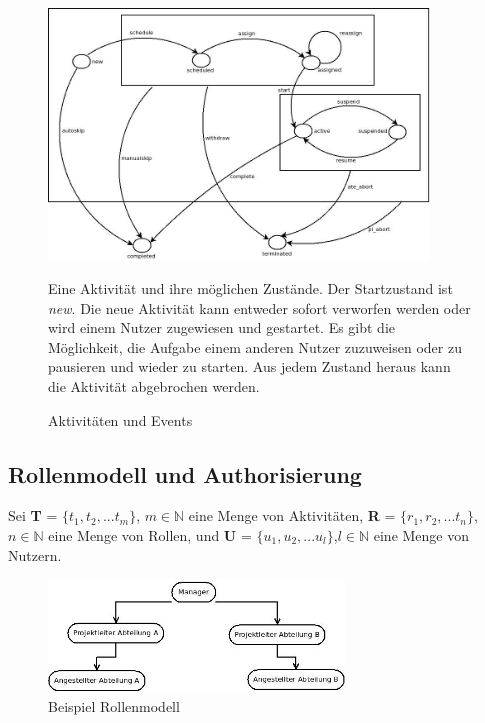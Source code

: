 \begin{figure}[ht]
	\centering
  \includegraphics[width=0.9\textwidth]{Figures/Taskevents}

\small Eine Aktivität und ihre möglichen Zustände. Der Startzustand ist \textit{new}. Die neue Aktivität kann entweder sofort verworfen werden oder wird einem Nutzer zugewiesen und gestartet. Es gibt die Möglichkeit, die Aufgabe einem anderen Nutzer zuzuweisen oder zu pausieren und wieder zu starten. Aus jedem Zustand heraus kann die Aktivität abgebrochen werden.
	\caption{Aktivitäten und Events}
	\label{fig2}
\end{figure}
 

\subsection{Rollenmodell und Authorisierung}
Sei \textbf{T} = $\{t_1,t_2,...t_m\}$, $m\in\mathbb{N}$ eine Menge von Aktivitäten, \textbf{R} = $\{r_1,r_2,...t_n\}$, $n\in\mathbb{N}$ eine Menge von Rollen, und \textbf{U} = $\{u_1,u_2,...u_l\}$,$l\in\mathbb{N}$ eine Menge von Nutzern.

\begin{figure}[ht]
	\centering
  \includegraphics[width=0.7\textwidth]{Figures/Rollenmodell}
	\caption{Beispiel Rollenmodell}
	\label{fig:examplerolemodel}
\end{figure}

